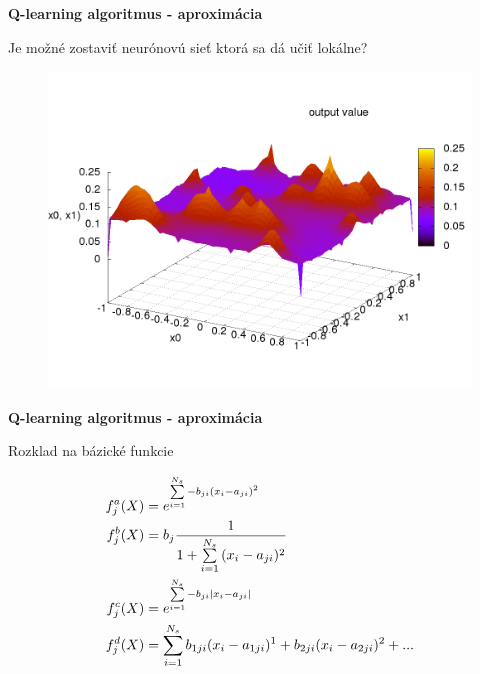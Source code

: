 \documentclass[xcolor=dvipsnames]{beamer}
\begin{document}
\begin{frame}{\bf Q-learning algoritmus - aproximácia}

Je možné zostaviť neurónovú sieť ktorá sa dá učiť lokálne?

\begin{figure}[!htb]
\includegraphics[scale=.35]{../pictures/gaussian.png}
\end{figure}

\end{frame}


\begin{frame}{\bf Q-learning algoritmus - aproximácia}

Rozklad na bázické funkcie

\begin{align}
    f_j^a(\boldmath{X}) &= e^{ \sum\limits_{i=1}^{N_s}{-b_{ji}(x_i - a_{ji})^2} } \\
    f_j^b(\boldmath{X}) &= b_{j}\frac{1}{1 + \sum\limits_{i=1}^{N_s}{(x_i - a_{ji})^2}} \nonumber \\
    f_j^c(\boldmath{X}) &= e^{ \sum\limits_{i=1}^{N_s}{-b_{ji}\mid x_i - a_{ji} \mid} } \nonumber  \\
    f_j^d(\boldmath{X}) &= \sum\limits_{i=1}^{N_s}{ b_{1ji}(x_i - a_{1ji})^1 + b_{2ji}(x_i - a_{2ji})^2 + ...  } \nonumber
\end{align}

\end{frame}
\end{document}
